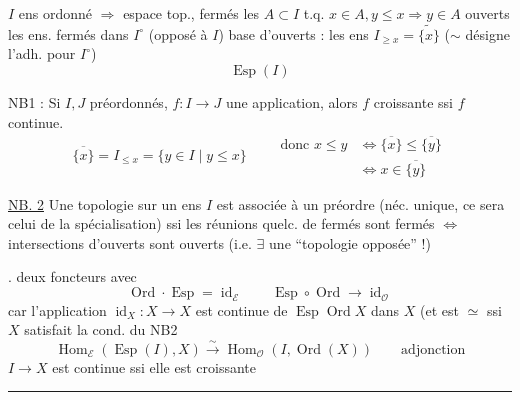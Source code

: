 $I$ ens ordonné $\Longrightarrow$ espace top., fermés les $A\subset I$ t.q. $x\in A,y\leq x\Rightarrow y\in A$
ouverts les ens. fermés dans $I^\circ$ (opposé à $I$)
base d'ouverts : les ens $I_{\geq x}=\widetilde{\{x\}}$ ($\sim$ désigne l'adh. pour $I^\circ$)
\[
\operatorname{Esp}(I)
\]

NB1 : Si $I,J$ préordonnés, $f:I\longrightarrow J$
une application, alors $f$ croissante ssi
$f$ continue.
\[
\overline{\{x\}}=I_{\leq x}=\{y\in I\mid y\leq x\}\qquad
\begin{aligned}
\text{donc }x\leq y&\Longleftrightarrow\overline{\{x\}}\leq\overline{\{y\}}\\
&\Longleftrightarrow x\in\overline{\{y\}}
\end{aligned}
\]

\uline{NB. 2} Une topologie sur un ens $I$ est associée à
un préordre (néc. unique,  ce sera celui de
la spécialisation) ssi les réunions quelc. de
fermés sont fermés $\Longleftrightarrow$ intersections d'ouverts
sont ouverts (i.e. $\exists$ une ``topologie opposée'' !)

. deux foncteurs
avec
\[
\operatorname{Ord}\cdot\operatorname{Esp}=\operatorname{id}_{\mathcal E}
\qquad
\operatorname{Esp}\circ\operatorname{Ord}\longrightarrow\operatorname{id}_{\mathcal O}
\]
car l'application $\operatorname{id}_X:X\longrightarrow X$
est continue de $\operatorname{Esp}\operatorname{Ord}X$
dans $X$ (et est $\simeq$ ssi $X$
satisfait la cond. du NB2
\[
\operatorname{Hom}_{\mathcal E}(\operatorname{Esp}(I),X)\xrightarrow{\sim}
\operatorname{Hom}_{\mathcal O}(I,\operatorname{Ord}(X))\qquad\text{adjonction}
\]
$I\longrightarrow X$ est continue ssi elle est croissante
\par\noindent\rule{2cm}{0.4pt}

